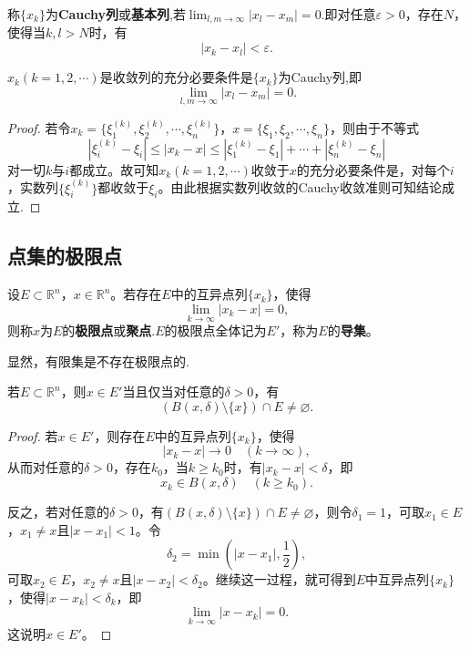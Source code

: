\documentclass[lang=cn,newtx,10pt,scheme=chinese]{../Template/elegantbook}
\begin{document}
\begin{definition}[Cauchy列]\label{definition:Cauchy列}
  称\(\{x_k\}\)为\textbf{Cauchy列}或\textbf{基本列},若$\lim_{l,m\rightarrow\infty}|x_l - x_m| = 0$.即对任意\(\varepsilon>0\)，存在\(N\)，使得当\(k,l>N\)时，有
\[|x_k - x_l|<\varepsilon.\]
\end{definition}

\begin{theorem}
  \(x_k(k = 1,2,\cdots)\)是收敛列的充分必要条件是\(\{x_k\}\)为Cauchy列,即
\[\lim_{l,m\rightarrow\infty}|x_l - x_m| = 0.\]
\end{theorem}
\begin{proof}
  若令\(x_k=\{\xi_1^{(k)},\xi_2^{(k)},\cdots,\xi_n^{(k)}\}\)，\(x = \{\xi_1,\xi_2,\cdots,\xi_n\}\)，则由于不等式
\[|\xi_i^{(k)} - \xi_i|\leqslant|x_k - x|\leqslant|\xi_1^{(k)} - \xi_1|+\cdots+|\xi_n^{(k)} - \xi_n|\]
对一切\(k\)与\(i\)都成立。故可知\(x_k(k = 1,2,\cdots)\)收敛于\(x\)的充分必要条件是，对每个\(i\)，实数列\(\{\xi_i^{(k)}\}\)都收敛于\(\xi_i\)。由此根据实数列收敛的Cauchy收敛准则可知结论成立.
\end{proof}

\subsection{点集的极限点}

\begin{definition}[极限点与导集]\label{definition:极限点与导集}
设\(E\subset\mathbb{R}^n\)，\(x\in\mathbb{R}^n\)。若存在\(E\)中的互异点列\(\{x_k\}\)，使得
\[\lim_{k\rightarrow\infty}|x_k - x| = 0,\]
则称\(x\)为\(E\)的\textbf{极限点}或\textbf{聚点}.\(E\)的极限点全体记为\(E'\)，称为\(E\)的\textbf{导集}。
\end{definition}
\begin{note}
  显然，有限集是不存在极限点的.
\end{note}

\begin{theorem}[一个点是极限点的充要条件]\label{theorem:一个点是极限点的充要条件}
若\(E\subset\mathbb{R}^n\)，则\(x\in E'\)当且仅当对任意的\(\delta>0\)，有
\[(B(x,\delta)\setminus\{x\})\cap E\neq\varnothing.\]
\end{theorem}
\begin{proof}
  若\(x\in E'\)，则存在\(E\)中的互异点列\(\{x_k\}\)，使得
\[|x_k - x|\to 0\quad(k\to\infty),\]
从而对任意的\(\delta>0\)，存在\(k_0\)，当\(k\geqslant k_0\)时，有\(|x_k - x|<\delta\)，即
\[x_k\in B(x,\delta)\quad(k\geqslant k_0).\]

反之，若对任意的\(\delta>0\)，有\((B(x,\delta)\setminus\{x\})\cap E\neq\varnothing\)，则令\(\delta_1 = 1\)，可取\(x_1\in E\)，\(x_1\neq x\)且\(|x - x_1|<1\)。令
\[\delta_2=\min\left(|x - x_1|,\frac{1}{2}\right),\]
可取\(x_2\in E\)，\(x_2\neq x\)且\(|x - x_2|<\delta_2\)。继续这一过程，就可得到\(E\)中互异点列\(\{x_k\}\)，使得\(|x - x_k|<\delta_k\)，即
\[\lim_{k\to\infty}|x - x_k| = 0.\]
这说明\(x\in E'\)。
\end{proof}
\end{document}
